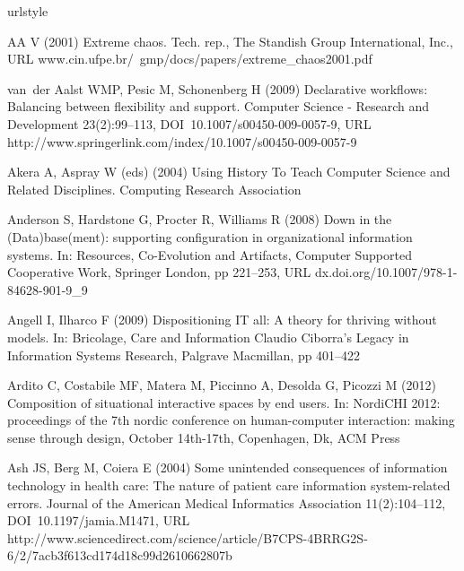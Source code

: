 \documentclass{article}
\begin{document}
\begin{thebibliography}{193}
\providecommand{\natexlab}[1]{#1}
\providecommand{\url}[1]{{#1}}
\providecommand{\urlprefix}{URL }
\expandafter\ifx\csname urlstyle\endcsname\relax
  \providecommand{\doi}[1]{DOI~\discretionary{}{}{}#1}\else
  \providecommand{\doi}{DOI~\discretionary{}{}{}\begingroup
  \urlstyle{rm}\Url}\fi
\providecommand{\eprint}[2][]{\url{#2}}

{AA} V (2001) Extreme chaos. Tech. rep., The Standish Group International,
  Inc., \urlprefix\url{www.cin.ufpe.br/~gmp/docs/papers/extreme_chaos2001.pdf}

van~der Aalst WMP, Pesic M, Schonenberg H (2009) Declarative workflows:
  Balancing between flexibility and support. Computer Science - Research and
  Development 23(2):99--113, \doi{10.1007/s00450-009-0057-9},
  \urlprefix\url{http://www.springerlink.com/index/10.1007/s00450-009-0057-9}

Akera A, Aspray W (eds)  (2004) Using History To Teach Computer Science and
  Related Disciplines. Computing Research Association

Anderson S, Hardstone G, Procter R, Williams R (2008) Down in the
  {(Data)base(ment):} supporting configuration in organizational information
  systems. In: Resources, Co-Evolution and Artifacts, Computer Supported
  Cooperative Work, Springer London, pp 221--253,
  \urlprefix\url{dx.doi.org/10.1007/978-1-84628-901-9_9}

Angell I, Ilharco F (2009) Dispositioning {IT} all: A theory for thriving
  without models. In: Bricolage, Care and Information Claudio Ciborra's Legacy
  in Information Systems Research, Palgrave Macmillan, pp 401--422

Ardito C, Costabile MF, Matera M, Piccinno A, Desolda G, Picozzi M (2012)
  Composition of situational interactive spaces by end users. In: {NordiCHI}
  2012: proceedings of the 7th nordic conference on human-computer interaction:
  making sense through design, October 14th-17th, Copenhagen, Dk, {ACM} Press

Ash JS, Berg M, Coiera E (2004) Some unintended consequences of information
  technology in health care: The nature of patient care information
  system-related errors. Journal of the American Medical Informatics
  Association 11(2):104--112, \doi{10.1197/jamia.M1471},
  \urlprefix\url{http://www.sciencedirect.com/science/article/B7CPS-4BRRG2S-6/2/7acb3f613cd174d18c99d2610662807b}


\end{thebibliography}
\end{document}
